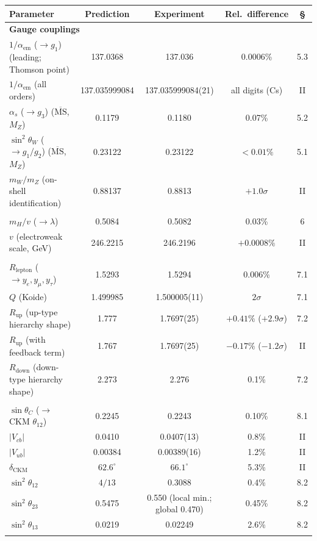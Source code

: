 \documentclass[12pt,a4paper]{article}
\begin{document}
\begin{center}\scriptsize\setlength{\tabcolsep}{3pt}
\begin{tabular}{@{}lcccc@{}}
\toprule
Parameter & Prediction & Experiment & Rel.\ difference & \S \\
\midrule
\multicolumn{5}{l}{\textbf{Gauge couplings}} \\
$1/\alpha_\mathrm{em}$ ($\to g_1$) (leading; Thomson point) & 137.0368 & 137.036 & 0.0006\% & 5.3 \\
$1/\alpha_\mathrm{em}$ (all orders) & 137.035999084 & 137.035999084(21) & all digits (Cs) & II \\
$\alpha_s$ ($\to g_3$) ($\overline{\mathrm{MS}}$, $M_Z$) & 0.1179 & 0.1180 & 0.07\% & 5.2 \\
$\sin^2\!\theta_W$ ($\to g_1/g_2$) ($\overline{\mathrm{MS}}$, $M_Z$) & 0.23122 & 0.23122 & $<0.01\%$ & 5.1 \\
$m_W/m_Z$ (on-shell identification) & 0.88137 & 0.8813 & $+1.0\sigma$ & II \\
\addlinespace
\multicolumn{5}{l}{\textbf{Higgs}} \\
$m_H/v$ ($\to\lambda$) & 0.5084 & 0.5082 & 0.03\% & 6 \\
$v$ (electroweak scale, GeV) & 246.2215 & 246.2196 & $+0.0008\%$ & II \\
\addlinespace
\multicolumn{5}{l}{\textbf{Fermion masses}} \\
$R_\mathrm{lepton}$ ($\to y_e, y_\mu, y_\tau$) & 1.5293 & 1.5294 & 0.006\% & 7.1 \\
$Q$ (Koide) & 1.499985 & 1.500005(11) & $2\sigma$ & 7.1 \\
$R_\mathrm{up}$ (up-type hierarchy shape) & 1.777 & 1.7697(25) & $+0.41\%$ ($+2.9\sigma$) & 7.2 \\
$R_\mathrm{up}$ (with feedback term) & 1.767 & 1.7697(25) & $-0.17\%$ ($-1.2\sigma$) & II \\
$R_\mathrm{down}$ (down-type hierarchy shape) & 2.273 & 2.276 & 0.1\% & 7.2 \\
\addlinespace
\multicolumn{5}{l}{\textbf{CKM / PMNS mixing}} \\
$\sin\theta_C$ ($\to$ CKM $\theta_{12}$) & 0.2245 & 0.2243 & 0.10\% & 8.1 \\
$|V_{cb}|$ & 0.0410 & 0.0407(13) & 0.8\% & II \\
$|V_{ub}|$ & 0.00384 & 0.00389(16) & 1.2\% & II \\
$\delta_\mathrm{CKM}$ & $62.6^\circ$ & $66.1^\circ$ & 5.3\% & II \\
$\sin^2\!\theta_{12}$ & $4/13$ & 0.3088 & 0.4\% & 8.2 \\
$\sin^2\!\theta_{23}$ & 0.5475 & 0.550 (local min.; global 0.470) & 0.45\% & 8.2 \\
$\sin^2\!\theta_{13}$ & 0.0219 & 0.02249 & 2.6\% & 8.2 \\
\addlinespace
\bottomrule
\end{tabular}
\end{center}
\end{document}
